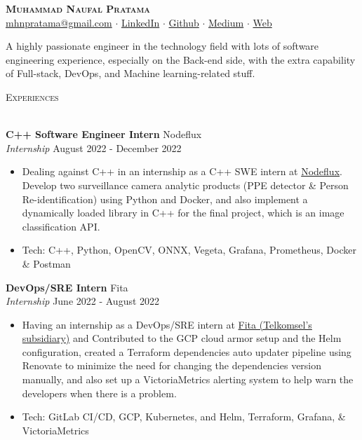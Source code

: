 \documentclass[a4paper]{article}
\newcommand{\lineunder} {
    \vspace*{-8pt} \\
    \hspace*{-18pt} \hrulefill \\
}
\newcommand{\header} [1] {
    {\hspace*{-18pt}\vspace*{6pt} \textsc{#1}}
    \vspace*{-6pt} \lineunder
}
\begin{document}
\vspace*{-40pt}

\vspace*{-10pt}
\begin{center}
	{\Huge \scshape \textbf{Muhammad Naufal Pratama}}\\
	\href{mailto:mhnpratama@gmail.com}{mhnpratama@gmail.com} $\cdot$ \href{https://linkedin.com/in/mnpratamaa}{LinkedIn} $\cdot$ \href{https://github.com/mhnaufal}{Github} $\cdot$ \href{https://medium.com/@mprtmma}{Medium} $\cdot$ \href{https://mhnaufal.github.io/}{Web}\\
\end{center}

A highly passionate engineer in the technology field with lots of software engineering experience, especially on the Back-end side, with the extra capability of Full-stack, DevOps, and Machine learning-related stuff.\\
\hfill \break

\header{Experiences}
\vspace{1mm}

\textbf{C++ Software Engineer Intern} \hfill Nodeflux\\
\textit{Internship} \hfill August 2022 - December 2022\\
\vspace{-1mm}
\begin{itemize} \itemsep 1pt
	\item Dealing against C++ in an internship as a C++ SWE intern at \href{https://www.nodeflux.io/}{Nodeflux}. Develop two surveillance camera analytic products (PPE detector \& Person Re-identification) using Python and Docker, and also implement a dynamically loaded library in C++ for the final project, which is an image classification API.
	\item Tech: C++, Python, OpenCV, ONNX, Vegeta, Grafana, Prometheus, Docker \& Postman
\end{itemize}

\textbf{DevOps/SRE Intern} \hfill Fita\\
\textit{Internship} \hfill June 2022 - August 2022\\
\vspace{-1mm}
\begin{itemize} \itemsep 1pt
	\item Having an internship as a DevOps/SRE intern at \href{https://fita.co.id/}{Fita (Telkomsel's subsidiary)} and Contributed to the GCP cloud armor setup and the Helm configuration, created a Terraform dependencies auto updater pipeline using Renovate to minimize the need for changing the dependencies version manually, and also set up a VictoriaMetrics alerting system to help warn the developers when there is a problem.
	\item Tech: GitLab CI/CD, GCP, Kubernetes, and Helm, Terraform, Grafana, \& VictoriaMetrics
\end{itemize}
\end{document}
